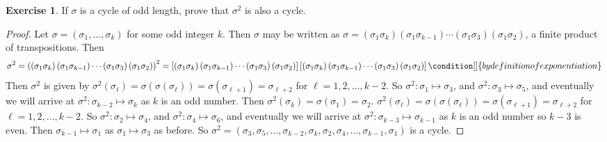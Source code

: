 \documentclass{article}
\theoremstyle{definition}
\newtheorem{theorem}{Exercise}[section]
\theoremstyle{remark}
\begin{document}
	
	\setcounter{theorem}{22}
	\begin{theorem}
		If $\sigma$ is a cycle of odd length, prove that $\sigma^2$ is also a cycle.
	\end{theorem}
	\begin{proof}
		Let $\sigma = \left(\sigma_1,\ldots,\sigma_k\right)$ for some odd integer $k$. Then $\sigma$ may be written as $\sigma=\left(\sigma_1\sigma_k\right)\left(\sigma_1\sigma_{k-1}\right)\cdots\left(\sigma_1\sigma_3\right)\left(\sigma_1\sigma_2\right)$, a finite product of transpositions. Then 
		\begin{dmath*}
			\sigma^2 = \left(\left(\sigma_1\sigma_k\right)\left(\sigma_1\sigma_{k-1}\right)\cdots\left(\sigma_1\sigma_3\right)\left(\sigma_1\sigma_2\right)\right)^2 = \left[\left(\sigma_1\sigma_k\right)\left(\sigma_1\sigma_{k-1}\right)\cdots\left(\sigma_1\sigma_3\right)\left(\sigma_1\sigma_2\right)\right]\left[\left(\sigma_1\sigma_k\right)\left(\sigma_1\sigma_{k-1}\right)\cdots\left(\sigma_1\sigma_3\right)\left(\sigma_1\sigma_2\right)\right] \condition[]{by definition of exponentiation}
		\end{dmath*} Then $\sigma^2$ is given by $\sigma^2\left(\sigma_\ell\right) = \sigma \left(\sigma\left(\sigma_{\ell}\right)\right) = \sigma\left(\sigma_{\ell+1}\right) = \sigma_{\ell+2}$ for $\ell=1,2,\ldots,k-2$. So $\sigma^2:\sigma_1\mapsto \sigma_3$, and $\sigma^2:\sigma_3\mapsto \sigma_5$, and eventually we will arrive at $\sigma^2:\sigma_{k-2}\mapsto\sigma_{k}$ as  $k$ is an odd number. Then $\sigma^2\left(\sigma_k\right)=\sigma\left(\sigma_1\right)=\sigma_2$. $\sigma^2\left(\sigma_\ell\right) = \sigma \left(\sigma\left(\sigma_{\ell}\right)\right) = \sigma\left(\sigma_{\ell+1}\right) = \sigma_{\ell+2}$ for $\ell=1,2,\ldots,k-2$. So $\sigma^2:\sigma_2\mapsto \sigma_4$, and $\sigma^2:\sigma_4\mapsto \sigma_6$, and eventually we will arrive at $\sigma^2:\sigma_{k-3}\mapsto\sigma_{k-1}$ as  $k$ is an odd number so $k-3$ is even. Then $\sigma_{k-1}\mapsto \sigma_1$ as $\sigma_1\mapsto\sigma_3$ as before. So $\sigma^2=\left(\sigma_3,\sigma_5,\ldots,\sigma_{k-2},\sigma_k,\sigma_2,\sigma_4,\ldots,\sigma_{k-1},\sigma_1\right)$ is a cycle.
	\end{proof}
\end{document}
